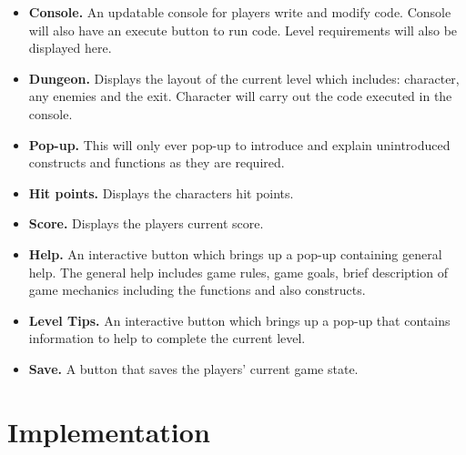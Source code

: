 \documentclass[a4paper,11.5pt]{report}
\numberwithin{figure}{section}
\numberwithin{table}{section}
\numberwithin{equation}{section}
\numberwithin{equation}{section}
\newcommand\blankpage{%
    \null
    \thispagestyle{empty}%
    \addtocounter{page}{-1}%
    \newpage}
\begin{document}
\begin{itemize}

	\item \textbf{Console.} An updatable console for players write and modify code. Console will also have an execute button to run code. Level requirements will also be displayed here.
	\item \textbf{Dungeon.} Displays the layout of the current level which includes: character, any enemies and the exit. Character will carry out the code executed in the console.
	\item \textbf{Pop-up.} This will only ever pop-up to introduce and explain unintroduced constructs and functions as they are required.
	\item \textbf{Hit points.} Displays the characters hit points.
	\item \textbf{Score.} Displays the players current score.
	\item \textbf{Help.} An interactive button which brings up a pop-up containing general help. The general help includes game rules, game goals, brief description of game mechanics including the functions and also constructs.
	\item \textbf{Level Tips.} An interactive button which brings up a pop-up that contains information to help to complete the current level.
	\item \textbf{Save.} A button that saves the players' current game state.

\end{itemize}


\afterpage{\blankpage}


\chapter{Implementation}

\end{document}
